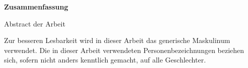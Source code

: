 \newpage
\begin{center}
    \textbf{Zusammenfassung}
\end{center}
Abstract der Arbeit

\vfill
\noindent
Zur besseren Lesbarkeit wird in dieser Arbeit das generische Maskulinum verwendet. Die in dieser Arbeit verwendeten Personenbezeichnungen beziehen sich, sofern nicht anders kenntlich gemacht, auf alle Geschlechter.
\newpage
